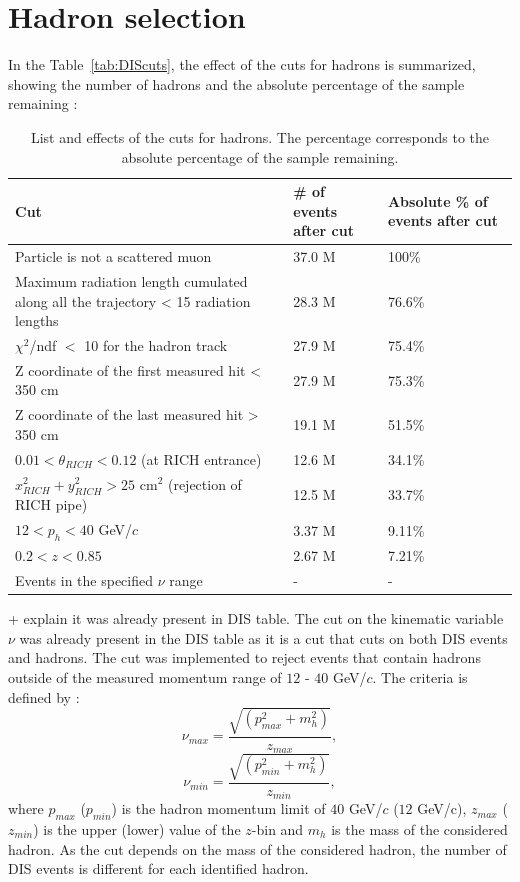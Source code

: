 
\section{Hadron selection}

In the Table~\ref{tab:DIScuts}, the effect of the cuts for hadrons is summarized, showing the number of hadrons and the absolute percentage of the sample remaining :

\begin{table}[!h]
  \centering
  \caption{List and effects of the cuts for hadrons. The percentage corresponds to the absolute percentage of the sample remaining.}
  \label{pic:Hadroncuts}
  \begin{tabular}{p{10cm} p{2cm} p{2cm}}
    \hline
    \hline
     Cut & \# of events after cut & Absolute \% of events after cut  \\
    \hline
    \hline
    Particle is not a scattered muon & 37.0 M & 100\% \\
    Maximum radiation length cumulated along all the trajectory < 15 radiation lengths & 28.3 M & 76.6\% \\
    $\chi^2$/ndf $<$ 10 for the hadron track & 27.9 M & 75.4\% \\
    Z coordinate of the first measured hit < 350 cm & 27.9 M & 75.3\% \\
    Z coordinate of the last measured hit > 350 cm & 19.1 M & 51.5\% \\
    $0.01 < \theta_{RICH} < 0.12$ (at RICH entrance) & 12.6 M & 34.1\% \\
    $x^2_{RICH} + y^2_{RICH} > 25$ cm$^2$ (rejection of RICH pipe) & 12.5 M & 33.7\% \\
    $12 < p_h < 40$ GeV/$c$ & 3.37 M & 9.11\% \\
    $0.2 < z < 0.85$ & 2.67 M & 7.21\% \\
    Events in the specified $\nu$ range & - & - \\
    \hline
    \hline
  \end{tabular}
\end{table}

+ explain it was already present in DIS table.
The cut on the kinematic variable $\nu$ was already present in the DIS table as it is a cut that cuts on both DIS events and hadrons. The cut was implemented to reject events that contain hadrons outside of the measured momentum range of $12$ - $40$ GeV/$c$. The criteria is defined by :
%
\begin{equation}
  \nu_{max} = \frac{\sqrt{(p^2_{max}+m^2_h)}}{z_{max}},
\end{equation}
\begin{equation}
  \nu_{min} = \frac{\sqrt{(p^2_{min}+m^2_h)}}{z_{min}},
\end{equation}
%
where $p_{max}$ ($p_{min}$) is the hadron momentum limit of $40$ GeV/$c$ ($12$ GeV/c), $z_{max}$ ($z_{min}$) is the upper (lower) value of the $z$-bin and $m_h$ is the mass of the considered hadron. As the cut depends on the mass of the considered hadron, the number of DIS events is different for each identified hadron.

